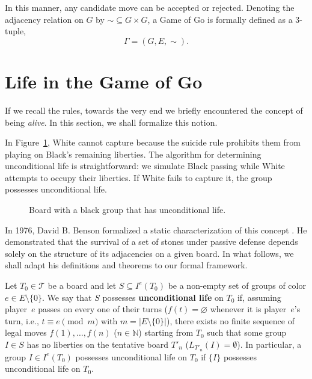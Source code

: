 In this manner, any candidate move can be accepted or rejected. Denoting the adjacency relation on $G$ by $\sim \subseteq G \times G$, a Game of Go is formally defined as a 3-tuple,
$$\Gamma = (G, E, \sim).$$

\section{Life in the Game of Go}\label{sec-vida}

If we recall the rules, towards the very end we briefly encountered the concept of being \textit{alive}. In this section, we shall formalize this notion.

In Figure~\ref{fig:vida_incond_ejemplo}, White cannot capture because the suicide rule prohibits them from playing on Black's remaining liberties. The algorithm for determining unconditional life is straightforward: we simulate Black passing while White attempts to occupy their liberties. If White fails to capture it, the group possesses unconditional life.

\begin{figure}[H]
	\centering
	\begin{goban}[7, hoshi = false]
	\end{goban}
	\caption{Board with a black group that has unconditional life.}
	\label{fig:vida_incond_ejemplo}
\end{figure}

In 1976, David B. Benson formalized a static characterization of this concept \cite{Benson}. He demonstrated that the survival of a set of stones under passive defense depends solely on the structure of its adjacencies on a given board. In what follows, we shall adapt his definitions and theorems to our formal framework.

\begin{definition}\label{def:unconditional_life}
	Let $T_0 \in \mathcal{T}$ be a board and let $S \subseteq I^e(T_0)$ be a non-empty set
	of groups of color $e \in E \setminus \{0\}$. We say that $S$ possesses
	\textbf{unconditional life} on $T_0$ if, assuming player~$e$ passes on every one of
	their turns ($f(t) = \varnothing$ whenever it is player~$e$'s turn, i.e.,
	$t \equiv e \pmod{m}$ with $m = |E \setminus \{0\}|$), there exists no finite sequence
	of legal moves $f(1), \dots, f(n)$ ($n \in \mathbb{N}$) starting from $T_0$ such that
	some group $I \in S$ has no liberties on the tentative board $T'_n$
	($L_{T'_n}(I) = \emptyset$). In particular, a group $I \in I^e(T_0)$ possesses
	unconditional life on $T_0$ if $\{I\}$ possesses unconditional life on $T_0$.
\end{definition}

